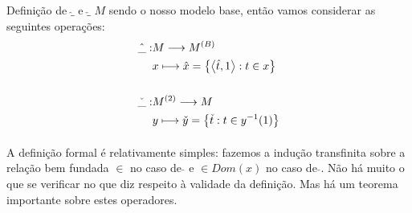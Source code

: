     \begin{definition}{Definição de $\hat{\_}$ e $\check{\_}$}
        $M$ sendo o nosso modelo base, então vamos considerar as seguintes operações:
        \begin{align*}
            \hat{\_}   :&M \longrightarrow \M{B}\\
                        &x \longmapsto   \hat{x} = \SET{\TUPLE{\hat{t}, 1}:t \in x}\\
                        & \\
            \check{\_} :&\M{2} \longrightarrow M\\
                        &y \longmapsto \check{y} = \SET{\check{t} : t\in y^{-1}(1)}
        \end{align*}
        \paragraph{}
            A definição formal é relativamente simples: fazemos a indução transfinita 
            sobre a relação bem fundada $\in$ no caso de $\hat{}$ e $\in Dom(x)$ no 
            caso de $\check{}$. Não há muito o que se verificar no que diz respeito 
            à validade da definição. Mas há um teorema importante sobre estes operadores.
    \end{definition}
